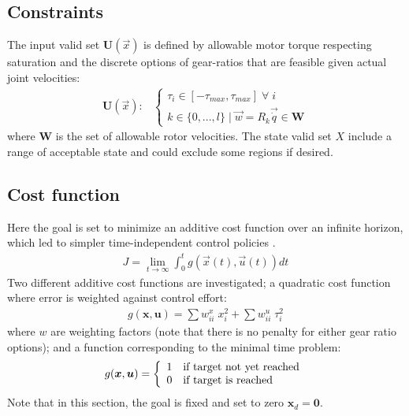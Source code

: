\subsection{Constraints}

The input valid set $\boldsymbol{U}(\vec{x})$ is defined by allowable motor torque respecting saturation and the discrete options of gear-ratios that are feasible given actual joint velocities:
\begin{align}
	\boldsymbol{U}(\vec{x}):&\left\{
	\begin{array}{l}
	\tau_i \in [ -\tau_{max} , \tau_{max} ] \;\forall\; i\\
	 k      \in \{ 0 , ... , l \} \; | \; \vec{w} = R_k \vec{\dot{q}} \in \boldsymbol{W} 
	\end{array}
	\right.
\end{align}
where $\boldsymbol{W}$ is the set of allowable rotor velocities. The state valid set $X$ include a range of acceptable state and could exclude some regions if desired. 

\subsection{Cost function}
\label{sec:CostFunction}

Here the goal is set to minimize an additive cost function over an infinite horizon, which led to simpler time-independent control policies \cite{bertsekas_dynamic_2000}.
%
\begin{align}
	J = \lim_{ t \rightarrow \infty} \int_0^t g(\vec{x}(t),\vec{u}(t)) dt 
	\label{eq:j_lim}
\end{align}
%
Two different additive cost functions are investigated; a quadratic cost function where error is weighted against control effort:
%
\begin{align}
	g(\boldsymbol{x},\boldsymbol{u}) = \sum w^x_{ii} \; x_i^2 + \sum w^u_{ii} \; \tau_i^2
	\label{eq:g_quad}
\end{align}
%
where $w$ are weighting factors (note that there is no penalty for either gear ratio options); and a function corresponding to the minimal time problem:
%
\begin{align}
	g(\boldsymbol{x},\boldsymbol{u}) = \left \{ \begin{array}[pos]{l}	1 \quad   \text{if target not yet reached} \\ 0 \quad   \text{if target is reached} \end{array}  \right.
	\label{eq:g_time}
\end{align}
%
Note that in this section, the goal is fixed and set to zero $\boldsymbol{x}_d=\boldsymbol{0}$.



